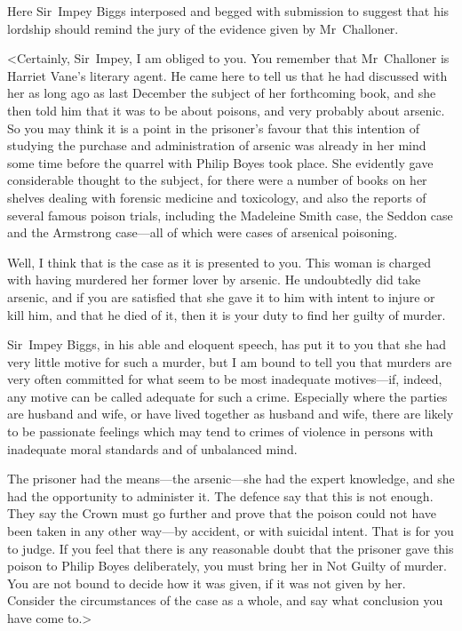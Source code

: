 Here Sir~Impey Biggs interposed and begged with submission to suggest that his lordship should remind the jury of the evidence given by Mr~Challoner.

<Certainly, Sir~Impey, I am obliged to you. You remember that Mr~Challoner is Harriet Vane's literary agent. He came here to tell us that he had discussed with her as long ago as last December the subject of her forthcoming book, and she then told him that it was to be about poisons, and very probably about arsenic. So you may think it is a point in the prisoner's favour that this intention of studying the purchase and administration of arsenic was already in her mind some time before the quarrel with Philip Boyes took place. She evidently gave considerable thought to the subject, for there were a number of books on her shelves dealing with forensic medicine and toxicology, and also the reports of several famous poison trials, including the Madeleine Smith case, the Seddon case and the Armstrong case—all of which were cases of arsenical poisoning.

Well, I think that is the case as it is presented to you. This woman is charged with having murdered her former lover by arsenic. He undoubtedly did take arsenic, and if you are satisfied that she gave it to him with intent to injure or kill him, and that he died of it, then it is your duty to find her guilty of murder.

Sir~Impey Biggs, in his able and eloquent speech, has put it to you that she had very little motive for such a murder, but I am bound to tell you that murders are very often committed for what seem to be most inadequate motives—if, indeed, any motive can be called adequate for such a crime. Especially where the parties are husband and wife, or have lived together as husband and wife, there are likely to be passionate feelings which may tend to crimes of violence in persons with inadequate moral standards and of unbalanced mind.

The prisoner had the means—the arsenic—she had the expert knowledge, and she had the opportunity to administer it. The defence say that this is not enough. They say the Crown must go further and prove that the poison could not have been taken in any other way—by accident, or with suicidal intent. That is for you to judge. If you feel that there is any reasonable doubt that the prisoner gave this poison to Philip Boyes deliberately, you must bring her in Not Guilty of murder. You are not bound to decide how it was given, if it was not given by her. Consider the circumstances of the case as a whole, and say what conclusion you have come to.>